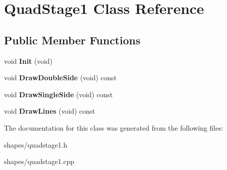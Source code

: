 \hypertarget{classQuadStage1}{\section{\-Quad\-Stage1 \-Class \-Reference}
\label{classQuadStage1}
}
\subsection*{\-Public \-Member \-Functions}
\begin{DoxyCompactItemize}
\item 
\hypertarget{classQuadStage1_aa3c6d9b8e67c105549ff641426e14841}{void {\bfseries \-Init} (void)}\label{classQuadStage1_aa3c6d9b8e67c105549ff641426e14841}

\item 
\hypertarget{classQuadStage1_a0708389164a78bfed94357c82fdbaffb}{void {\bfseries \-Draw\-Double\-Side} (void) const }\label{classQuadStage1_a0708389164a78bfed94357c82fdbaffb}

\item 
\hypertarget{classQuadStage1_a3f2bc17e1d89255560cb603a4251a6ee}{void {\bfseries \-Draw\-Single\-Side} (void) const }\label{classQuadStage1_a3f2bc17e1d89255560cb603a4251a6ee}

\item 
\hypertarget{classQuadStage1_aff9fa9ff12d1f40ee535b9f68b02e3f2}{void {\bfseries \-Draw\-Lines} (void) const }\label{classQuadStage1_aff9fa9ff12d1f40ee535b9f68b02e3f2}

\end{DoxyCompactItemize}


\-The documentation for this class was generated from the following files\-:\begin{DoxyCompactItemize}
\item 
shapes/quadstage1.\-h\item 
shapes/quadstage1.\-cpp\end{DoxyCompactItemize}

